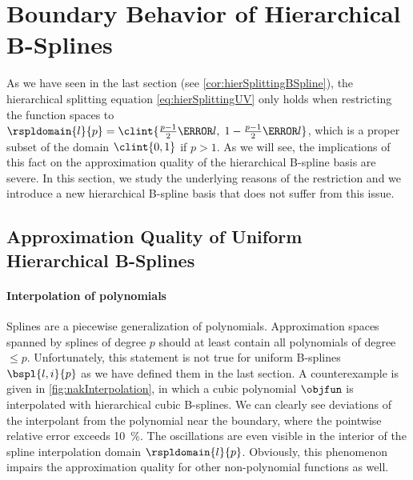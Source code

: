 \section{Boundary Behavior of Hierarchical B-Splines}
\label{sec:32notAKnot}


\noindent
As we have seen in the last section (see \cref{cor:hierSplittingBSpline}),
the hierarchical splitting equation \eqref{eq:hierSplittingUV}
only holds when restricting the function spaces to
$\rspldomain{l}{p} =
\clint{\tfrac{p-1}{2} \ms{l},\; 1 - \tfrac{p-1}{2} \ms{l}}$,
which is a proper subset of the domain $\clint{0, 1}$ if $p > 1$.
As we will see, the implications of this fact on the approximation quality
of the hierarchical B-spline basis are severe.
In this section, we study the underlying reasons of the restriction and
we introduce a new hierarchical B-spline basis
that does not suffer from this issue.



\subsection{Approximation Quality of Uniform Hierarchical B-Splines}
\label{sec:321approximation}


\paragraph{Interpolation of polynomials}

Splines are a piecewise generalization of polynomials.
Approximation spaces spanned by splines of degree $p$ should
at least contain all polynomials of degree $\le p$.
Unfortunately, this statement is not true for uniform B-splines
$\bspl{l,i}{p}$ as we have defined them in the last section.
A counterexample is given in \cref{fig:nakInterpolation},
in which a cubic polynomial $\objfun$ is interpolated with
hierarchical cubic B-splines.
We can clearly see deviations of the interpolant from the polynomial
near the boundary,
where the pointwise relative error exceeds \SI{10}{\percent}.
The oscillations are even visible in the interior of the
spline interpolation domain $\rspldomain{l}{p}$.
Obviously, this phenomenon impairs the approximation quality
for other non-polynomial functions as well.

